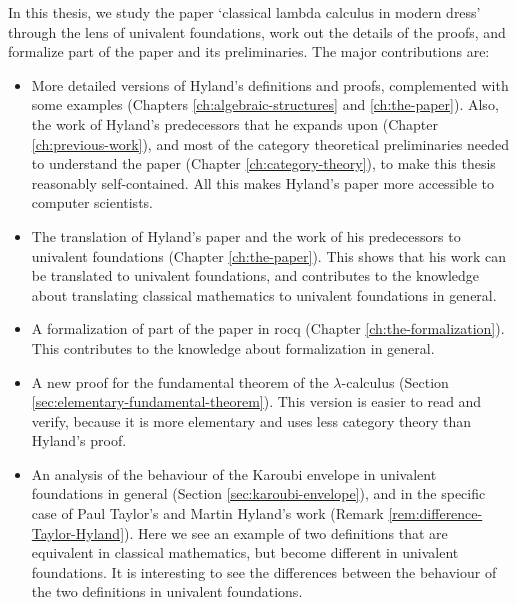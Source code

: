 In this thesis, we study the paper `classical lambda calculus in modern dress' through the lens of univalent foundations, work out the details of the proofs, and formalize part of the paper and its preliminaries. The major contributions are:
\begin{itemize}
  \item More detailed versions of Hyland's definitions and proofs, complemented with some examples (Chapters \ref{ch:algebraic-structures} and \ref{ch:the-paper}). Also, the work of Hyland's predecessors that he expands upon (Chapter \ref{ch:previous-work}), and most of the category theoretical preliminaries needed to understand the paper (Chapter \ref{ch:category-theory}), to make this thesis reasonably self-contained. All this makes Hyland's paper more accessible to computer scientists.
  \item The translation of Hyland's paper and the work of his predecessors to univalent foundations (Chapter \ref{ch:the-paper}). This shows that his work can be translated to univalent foundations, and contributes to the knowledge about translating classical mathematics to univalent foundations in general.
  \item A formalization of part of the paper in rocq (Chapter \ref{ch:the-formalization}). This contributes to the knowledge about formalization in general.
  \item A new proof for the fundamental theorem of the $ \lambda $-calculus (Section \ref{sec:elementary-fundamental-theorem}). This version is easier to read and verify, because it is more elementary and uses less category theory than Hyland's proof.
  \item An analysis of the behaviour of the Karoubi envelope in univalent foundations in general (Section \ref{sec:karoubi-envelope}), and in the specific case of Paul Taylor's and Martin Hyland's work (Remark \ref{rem:difference-Taylor-Hyland}). Here we see an example of two definitions that are equivalent in classical mathematics, but become different in univalent foundations. It is interesting to see the differences between the behaviour of the two definitions in univalent foundations.
\end{itemize}

